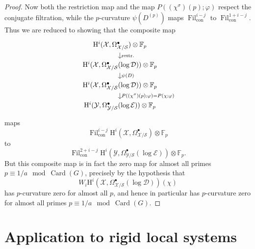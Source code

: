 \begin{proof}
Now both the restriction map and the map \(P((\chi^\sigma)(p);\varphi)\) respect the conjugate filtration, while the \(p\)-curvature \(\psi(D^{(p)})\) maps \(\operatorname{Fil}^{i-j}_{\mathrm{con}}\) to \(\operatorname{Fil}^{1+i-j}_{\mathrm{con}}\). Thus we are reduced to showing that the composite map
\[
\begin{tikzcd}[column sep=large,row sep=small]
\mathrm{H}^i(\mathcal{X},\Omega^\bullet_{\mathcal{X}/\mathcal{S}})\otimes\mathbb{F}_p
\arrow[d,"\operatorname{restr.}"]\\
\mathrm{H}^i(\mathcal{X},\Omega^\bullet_{\mathcal{X}/\mathcal{S}}(\log\mathcal{D}))\otimes\mathbb{F}_p
\arrow[d,"\psi(D)"]\\
\mathrm{H}^i(\mathcal{X},\Omega^\bullet_{\mathcal{X}/\mathcal{S}}(\log\mathcal{D}))\otimes\mathbb{F}_p
\arrow[d,"P((\chi^\sigma)(p);\varphi)=P(\chi;\varphi)"]\\
\mathrm{H}^i(\mathcal{Y},\Omega^\bullet_{\mathcal{Y}/\mathcal{S}}(\log\mathcal{E}))\otimes\mathbb{F}_p
\end{tikzcd}
\]
maps
\[
\operatorname{Fil}^{i-j}_{\mathrm{con}}\mathrm{H}^i(\mathcal{X},\Omega^\bullet_{\mathcal{X}/\mathcal{S}})\otimes\mathbb{F}_p
\]
to
\[
\operatorname{Fil}^{2+i-j}_{\mathrm{con}}\mathrm{H}^i(\mathcal{Y},\Omega^\bullet_{\mathcal{Y}/\mathcal{S}}(\log\mathcal{E}))\otimes\mathbb{F}_p.
\]
But this composite map is in fact the zero map for almost all primes \(p\equiv 1/a\mod \operatorname{Card}(G)\), precisely by the hypothesis that
\[
W_i\mathrm{H}^i(\mathcal{X},\Omega^\bullet_{\mathcal{X}/\mathcal{S}}(\log\mathcal{D}))(\chi)
\]
has \(p\)-curvature zero for almost all \(p\), and hence in particular has \(p\)-curvature zero for almost all primes \(p\equiv 1/a\mod \operatorname{Card}(G)\).
\end{proof}

\section{Application to rigid local systems}
\label{sec:9.4}


